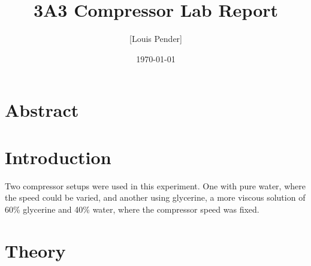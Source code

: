 \documentclass{article}
\title{3A3 Compressor Lab Report}
\author{[Louis Pender]}
\date{\today}
\begin{document}
\maketitle

\section{Abstract}

\section{Introduction}

Two compressor setups were used in this experiment.
One with pure water, where the speed could be varied, and another using glycerine, a more viscous solution of 60\%
glycerine and 40\% water, where the compressor speed was fixed.

\section{Theory}






\end{document}
